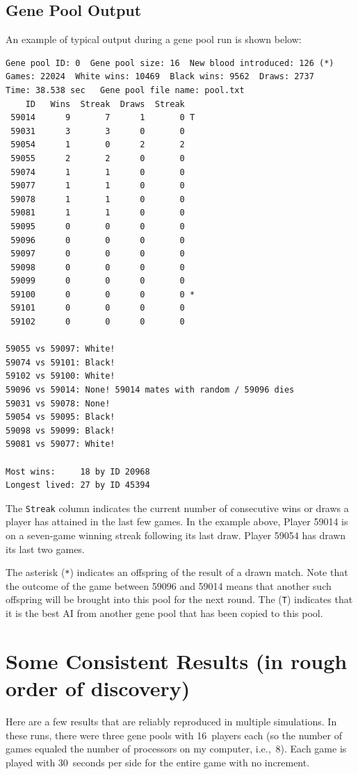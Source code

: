 \documentclass[letterpaper]{article}
\renewcommand\_{\textunderscore\allowbreak}
\begin{document}
\subsection{Gene Pool Output}
An example of typical output during a gene pool run is shown below:
\begin{verbatim}
Gene pool ID: 0  Gene pool size: 16  New blood introduced: 126 (*)
Games: 22024  White wins: 10469  Black wins: 9562  Draws: 2737
Time: 38.538 sec   Gene pool file name: pool.txt
    ID   Wins  Streak  Draws  Streak
 59014      9       7      1       0 T
 59031      3       3      0       0
 59054      1       0      2       2
 59055      2       2      0       0
 59074      1       1      0       0
 59077      1       1      0       0
 59078      1       1      0       0
 59081      1       1      0       0
 59095      0       0      0       0
 59096      0       0      0       0
 59097      0       0      0       0
 59098      0       0      0       0
 59099      0       0      0       0
 59100      0       0      0       0 *
 59101      0       0      0       0
 59102      0       0      0       0

59055 vs 59097: White!
59074 vs 59101: Black!
59102 vs 59100: White!
59096 vs 59014: None! 59014 mates with random / 59096 dies
59031 vs 59078: None!
59054 vs 59095: Black!
59098 vs 59099: Black!
59081 vs 59077: White!

Most wins:     18 by ID 20968
Longest lived: 27 by ID 45394
\end{verbatim}
The \verb|Streak| column indicates the current number of consecutive wins or draws a player has attained in the last few games. In the example above, Player 59014 is on a seven-game winning streak following its last draw. Player 59054 has drawn its last two games.

The asterisk (\verb|*|) indicates an offspring of the result of a drawn match. Note that the outcome of the game between 59096 and 59014 means that another such offspring will be brought into this pool for the next round. The (\verb|T|) indicates that it is the best AI from another gene pool that has been copied to this pool.


\section{Some Consistent Results (in rough order of discovery)}

Here are a few results that are reliably reproduced in multiple simulations. In these runs, there were three gene pools with 16~players each (so the number of games equaled the number of processors on my computer, i.e.,~8). Each game is played with 30~seconds per side for the entire game with no increment.
\end{document}
